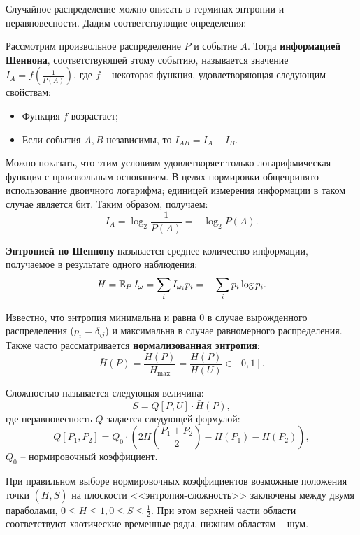 Случайное распределение можно описать в терминах энтропии и неравновесности. Дадим соответствующие определения:
\begin{definition}
    Рассмотрим произвольное распределение $P$ и событие $A$. Тогда \textbf{информацией Шеннона}, соответствующей этому событию, называется значение $I_A = f\left( \frac{1}{P(A)} \right)$, где $f$ -- некоторая функция, удовлетворяющая следующим свойствам:
    \begin{itemize}
    \item
        Функция $f$ возрастает;
    \item
        Если события $A, B$ независимы, то $I_{AB} = I_{A} + I_{B}$.
    \end{itemize}
    
    Можно показать, что этим условиям удовлетворяет только логарифмическая функция с произвольным основанием. В целях нормировки общепринято использование двоичного логарифма; единицей измерения информации в таком случае является бит. Таким образом, получаем:
    \begin{equation*}
        I_A = \log_2 \frac{1}{P(A)} = -\log_2 P(A).
    \end{equation*}
\end{definition}

\begin{definition}
    \textbf{Энтропией по Шеннону} называется среднее количество информации, получаемое в результате одного наблюдения:
    \begin{equation*}
        H = \operatorname{\mathbb{E}}_{P} I_{\omega} = \sum_{i} I_{\omega_i} p_i = -\sum_i p_i \log p_i.
    \end{equation*}
    
    Известно, что энтропия минимальна и равна 0 в случае вырожденного распределения ($p_i = \delta_{ij}$) и максимальна в случае равномерного распределения. Также часто рассматривается \textbf{нормализованная энтропия}:
    \begin{equation*}
        \bar{H}(P) = \frac{H(P)}{H_{\text{max}}} = \frac{H(P)}{H(U)} \in \left[ 0, 1 \right].
    \end{equation*}
\end{definition}

\begin{definition}[Сложность]
    Сложностью называется следующая величина:
    \begin{equation*}
        S = Q\left[ P, U \right] \cdot \bar{H}\left( P \right),
    \end{equation*}
    где неравновесность $Q$ задается следующей формулой:
    \begin{equation*}
        Q\left[ P_1, P_2 \right] = Q_0 \cdot \left( 2H\left( \frac{P_1 + P_2}{2} \right) - H(P_1) - H(P_2) \right),
    \end{equation*}
    $Q_0$ -- нормировочный коэффициент.
\end{definition}

При правильном выборе нормировочных коэффициентов возможные положения точки $(\bar{H}, S)$ на плоскости <<энтропия-сложность>> заключены между двумя параболами, $0 \leq H \leq 1, 0 \leq S \leq \frac{1}{2}$. При этом верхней части области соответствуют хаотические временные ряды, нижним областям -- шум.
